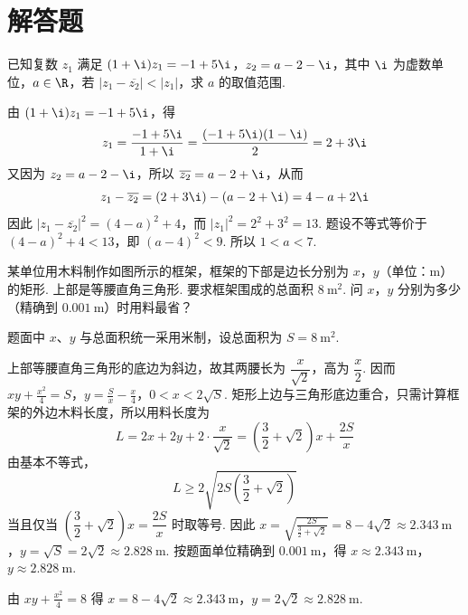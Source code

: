 \section{解答题}
\begin{problem}
已知复数 \(z_{1}\) 满足 \((1 + \i)z_{1} = -1 + 5\i\)，\(z_{2} = a - 2 - \i\)，其中 \(\i\) 为虚数单位，\(a \in \R\)，若 \(\left|z_{1} - \overline{z_{2}}\right| < |z_{1}|\)，求 \(a\) 的取值范围.
\end{problem}

\begin{solution}
由 \((1+\i)z_{1}=-1+5\i\)，得
\[
z_{1}=\frac{-1+5\i}{1+\i}=\frac{(-1+5\i)(1-\i)}{2}=2+3\i
\]
又因为 \(z_{2}=a-2-\i\)，所以 \(\overline{z_{2}}=a-2+\i\)，从而
\[
z_{1}-\overline{z_{2}}=(2+3\i)-(a-2+\i)=4-a+2\i
\]
因此 \(\left|z_{1}-\overline{z_{2}}\right|^{2}=(4-a)^{2}+4\)，而 \(|z_{1}|^{2}=2^{2}+3^{2}=13\). 题设不等式等价于 \((4-a)^{2}+4<13\)，即 \((a-4)^{2}<9\). 所以 \(1<a<7\).
\end{solution}

\begin{problem}
某单位用木料制作如图所示的框架，框架的下部是边长分别为 \(x\)，\(y\)（单位：\(\mathrm{m}\)）的矩形. 上部是等腰直角三角形. 要求框架围成的总面积 \(8 \mathrm{~m}^{2}\). 问 \(x\)，\(y\) 分别为多少（精确到 \(0.001 \mathrm{~m}\)）时用料最省？

\end{problem}

\begin{solution}
题面中 \(x\)、\(y\) 与总面积统一采用米制，设总面积为 \(S=8\mathrm{~m}^{2}\).

上部等腰直角三角形的底边为斜边，故其两腰长为 \(\dfrac{x}{\sqrt{2}}\)，高为 \(\dfrac{x}{2}\). 因而
\(xy+\frac{x^{2}}{4}=S\)，\(y=\frac{S}{x}-\frac{x}{4}\)，\(0<x<2\sqrt{S}\).
矩形上边与三角形底边重合，只需计算框架的外边木料长度，所以用料长度为
\[
L=2x+2y+2\cdot\frac{x}{\sqrt{2}}=\left(\frac{3}{2}+\sqrt{2}\right)x+\frac{2S}{x}
\]
由基本不等式，
\[
L\geqslant2\sqrt{2S\left(\frac{3}{2}+\sqrt{2}\right)}
\]
当且仅当 \(\left(\dfrac{3}{2}+\sqrt{2}\right)x=\dfrac{2S}{x}\) 时取等号. 因此
\(x=\sqrt{\frac{2S}{\frac{3}{2}+\sqrt{2}}}=8-4\sqrt{2}\approx2.343\mathrm{~m}\)，\(y=\sqrt{S}=2\sqrt{2}\approx2.828\mathrm{~m}\).
按题面单位精确到 \(0.001\mathrm{~m}\)，得 \(x\approx2.343\mathrm{~m}\)，\(y\approx2.828\mathrm{~m}\).

由 \(xy+\frac{x^{2}}{4}=8\) 得 \(x=8-4\sqrt{2}\approx2.343\mathrm{~m}\)，\(y=2\sqrt{2}\approx2.828\mathrm{~m}\).
\end{solution}


